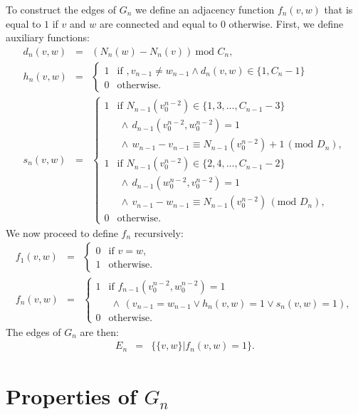 \documentclass{article}
\newcommand{\beq}{\begin{eqnarray}}
\newcommand{\eeq}{\end{eqnarray}}
\begin{document}
To construct the edges of $G_n$ we define an adjacency function $f_n(v,w)$
that is equal to $1$ if $v$ and $w$ are connected and equal to $0$ otherwise.
First, we define auxiliary functions:
\beq
d_n(v,w)
&=&
(N_n(w) - N_n(v)) \ \mbox{mod } C_n,
\\
h_n(v,w)
&=&
\begin{cases}
1 & \mbox{if }, v_{n-1} \neq w_{n-1} \land d_n(v,w) \in \{ 1, C_n - 1\}\\
0 & \mbox{otherwise}.
\end{cases}
\\
s_n(v,w)
&=&
\begin{cases}
1 & \mbox{if }
N_{n-1}(v_0^{n-2}) \in \{ 1, 3, \ldots, C_{n-1} - 3\} \\
&
\ \land \, d_{n-1}(v_0^{n-2}, w_0^{n-2}) = 1 \\
&
\ \land \, w_{n-1} - v_{n-1} \equiv N_{n-1}(v_0^{n-2}) + 1\, (\mbox{mod } D_n), \\
1 & \mbox{if }
N_{n-1}(v_0^{n-2}) \in \{ 2, 4, \ldots, C_{n-1} - 2\} \\
&
\ \land \, d_{n-1}(w_0^{n-2}, v_0^{n-2}) = 1 \\
&
\ \land \, v_{n-1} - w_{n-1} \equiv N_{n-1}(v_0^{n-2}) \, (\mbox{mod } D_n), \\
0 & \mbox{otherwise}.
\end{cases}
\eeq
We now proceed to define $f_n$ recursively:
\beq
f_1(v,w)
&=&
\begin{cases}
0 & \mbox{if } v = w, \\
1 & \mbox{otherwise}.
\end{cases} \\
\label{eq:fn}
f_n(v,w)
&=&
\begin{cases}
1 & \mbox{if } f_{n-1}(v_0^{n-2}, w_0^{n-2}) = 1 \\
&
\ \land \, (v_{n-1} = w_{n-1}
\lor
h_n(v, w) = 1
\lor
s_n(v, w) = 1
),\\
0 & \mbox{otherwise}.
\end{cases}
\eeq
The edges of $G_n$ are then:
\beq
E_n &=& \{\{ v, w \} | f_n(v,w) = 1 \}.
\eeq

\section{Properties of $G_n$}
\end{document}
